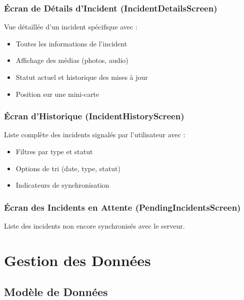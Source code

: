 \documentclass[12pt,a4paper]{article}
\begin{document}
\subsubsection{Écran de Détails d'Incident (IncidentDetailsScreen)}
Vue détaillée d'un incident spécifique avec :
\begin{itemize}
    \item Toutes les informations de l'incident
    \item Affichage des médias (photos, audio)
    \item Statut actuel et historique des mises à jour
    \item Position sur une mini-carte
\end{itemize}

\subsubsection{Écran d'Historique (IncidentHistoryScreen)}
Liste complète des incidents signalés par l'utilisateur avec :
\begin{itemize}
    \item Filtres par type et statut
    \item Options de tri (date, type, statut)
    \item Indicateurs de synchronisation
\end{itemize}

\subsubsection{Écran des Incidents en Attente (PendingIncidentsScreen)}
Liste des incidents non encore synchronisés avec le serveur.

\section{Gestion des Données}

\subsection{Modèle de Données}
\end{document}
